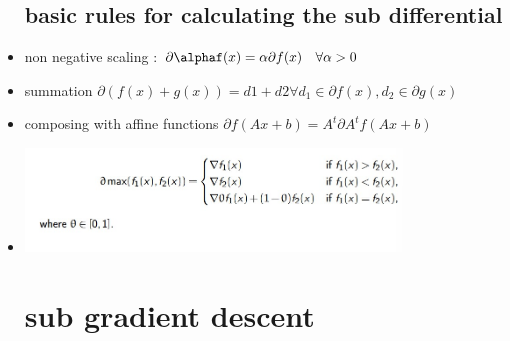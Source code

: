\documentclass{article}
\begin{document}
\begin{itemize}
\subsection{basic rules for calculating the sub differential }
\item non negative scaling : $ \partial \alphaf(x)=\alpha \partial f(x)\quad \forall \alpha>0$
\item summation $\partial(f(x)+g(x))=d1+d2 \forall d_1\in \partial f(x), d_2\in\partial g(x)$
\item composing with affine functions $\partial f(Ax+b)=A^{t}\partial A^{t}f(Ax+b)$
\item \includegraphics[width=10cm]{lecture_notes/lecture_4/immmages/l4_12.jpg}
\section{sub gradient descent}

\end{itemize}
\end{document}
